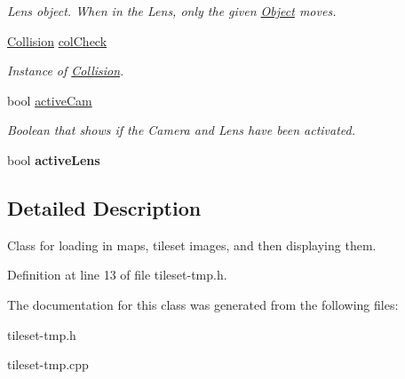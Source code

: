\begin{DoxyCompactItemize}
\begin{DoxyCompactList}\small\item\em Lens object. When in the Lens, only the given \hyperlink{classObject}{Object} moves. \end{DoxyCompactList}\item 
\hyperlink{classCollision}{Collision} \hyperlink{classTilesettmp_ad0e761a513aee95eb7158756aaa69019}{col\+Check}\hypertarget{classTilesettmp_ad0e761a513aee95eb7158756aaa69019}{}\label{classTilesettmp_ad0e761a513aee95eb7158756aaa69019}

\begin{DoxyCompactList}\small\item\em Instance of \hyperlink{classCollision}{Collision}. \end{DoxyCompactList}\item 
bool \hyperlink{classTilesettmp_a3f4bb658ab8b678c14ff1bc461ce6939}{active\+Cam}\hypertarget{classTilesettmp_a3f4bb658ab8b678c14ff1bc461ce6939}{}\label{classTilesettmp_a3f4bb658ab8b678c14ff1bc461ce6939}

\begin{DoxyCompactList}\small\item\em Boolean that shows if the Camera and Lens have been activated. \end{DoxyCompactList}\item 
bool {\bfseries active\+Lens}\hypertarget{classTilesettmp_aeae42941d1f1d5dd4dd04213428be8d9}{}\label{classTilesettmp_aeae42941d1f1d5dd4dd04213428be8d9}

\end{DoxyCompactItemize}


\subsection{Detailed Description}
Class for loading in maps, tileset images, and then displaying them. 

Definition at line 13 of file tileset-\/tmp.\+h.



The documentation for this class was generated from the following files\+:\begin{DoxyCompactItemize}
\item 
tileset-\/tmp.\+h\item 
tileset-\/tmp.\+cpp\end{DoxyCompactItemize}
